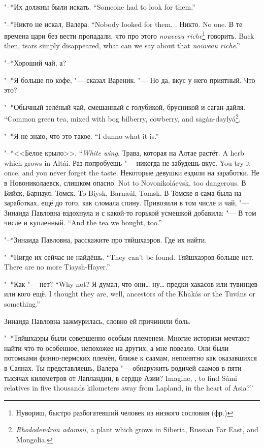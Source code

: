 {"--*Их должны были искать.}
{``Someone had to look for them.''}

{"--*Никто не искал, Валера.}
{``Nobody looked for them, \Valera.}
{Никто.}
{No one.}
{В те времена цари без вести пропадали, что про этого \textit{nouveau riche}\footnote{Нувориш, быстро разбогатевший человек из низкого сословия (фр.)} говорить.}
{Back then, tsars simply disappeared, what can we say about that \textit{nouveau riche}.''}

\asterism

"--*Хороший чай, а?

"--*Я больше по кофе, "--- сказал Вареник.
"--- Но да, вкус у него приятный.
Что это?

{"--*Обычный зелёный чай, смешанный с голубикой, брусникой и саган-дайля.}
{``Common green tea, mixed with bog bilberry, cowberry, and sag\'an-dayly\'a\footnote{\textit{Rhododendron adamsii}, a plant which grows in Siberia, Russian Far East, and Mongolia.}.}

{"--*Я не знаю, что это такое.}
{``I dunno what it is.''}

{"--*<<Белое крыло>>.}
{``\emph{White wing}.}
{Трава, которая на Алтае растёт.}
{A herb which grows in Alt\'ai.}
{Раз попробуешь "--- никогда не забудешь вкус.}
{You try it once, and you never forget the taste.}
Некоторые девушки ездили на заработки.
{Не в Новониколаевск, слишком опасно.}
{Not to Novonikol\'aevsk, too dangerous.}
{В Бийск, Барнаул, Томск.}
{To Biysk, Barna\'ul, Tomsk.}
В Томске я сама была на заработках, ещё до того, как сломала спину.
Привозили в том числе и чай, "--- Зинаида Павловна вздохнула и с какой-то горькой усмешкой добавила:
{"--- В том числе и купленный.}
{``And the tea we bought, too.''}

"--*Зинаида Павловна, расскажите про тяйшхаэров.
Где их найти.

{"--*Нигде их сейчас не найдёшь.}
{``They can't be found.}
{Тяйшхаэров больше нет.}
{There are no more Tiaysh-Hayer.''}

{"--*Как "--- нет?}
{``Why not?}
{Я думал, что они\ldots{} ну\ldots{} предки хакасов или тувинцев или кого ещё.}
{I thought they are, well, ancestors of the Khak\'as or the Tuv\'ans or something.''}

Зинаида Павловна зажмурилась, словно ей причинили боль.

"--*Тяйшхаэры были совершенно особым племенем.
Многие историки мечтают найти что-то особенное, непохожее на других, а мне повезло.
Они были потомками финно-пермских племён, ближе к саамам, непонятно как оказавшихся в Саянах.
{Ты представляешь, Валера "--- обнаружить родичей саамов в пяти тысячах километров от Лапландии, в сердце Азии?}
{Imagine, \Valera, to find S\'ami relatives in five thousands kilometers away from Lapland, in the heart of Asia?''}

